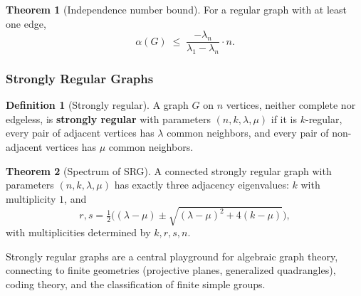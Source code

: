 \documentclass{article}
\theoremstyle{definition}
\newtheorem{theorem}{Theorem}
\newtheorem{definition}{Definition}
\begin{document}
\begin{theorem}[Independence number bound]
For a regular graph with at least one edge,
\[
  \alpha(G) \;\le\; \frac{-\lambda_n}{\lambda_1 - \lambda_n} \cdot n.
\]
\end{theorem}

\subsubsection{Strongly Regular Graphs}

\begin{definition}[Strongly regular]
A graph $G$ on $n$ vertices, neither complete nor edgeless, is
\textbf{strongly regular} with
parameters $(n, k, \lambda, \mu)$ if it is $k$-regular, every pair
of adjacent vertices has $\lambda$ common neighbors, and every pair
of non-adjacent vertices has $\mu$ common neighbors.
\end{definition}

\begin{theorem}[Spectrum of SRG]\label{thm:srgspectrum}
A connected strongly regular graph with parameters $(n, k, \lambda, \mu)$
has exactly three adjacency eigenvalues: $k$ with multiplicity $1$, and
\[
  r, s = \tfrac{1}{2}\Big((\lambda - \mu) \pm \sqrt{(\lambda - \mu)^2 + 4(k - \mu)}\Big),
\]
with multiplicities determined by $k, r, s, n$.
\end{theorem}

Strongly regular graphs are a central playground for algebraic graph
theory, connecting to finite geometries (projective planes,
generalized quadrangles), coding theory, and the classification of
finite simple groups.
\end{document}
